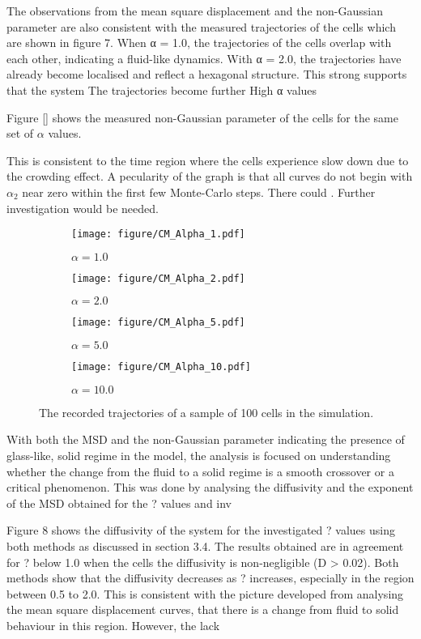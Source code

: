 \documentclass[a4paper,12pt]{article}
\begin{document}
The observations from the mean square displacement and the non-Gaussian parameter are also consistent with the measured trajectories of the cells which are shown in figure 7. When α = 1.0, the trajectories of the cells overlap with each other, indicating a fluid-like dynamics. With α = 2.0, the trajectories have already become localised and reflect a hexagonal structure. This strong supports that the system The trajectories become further  High α values 


Figure \ref{} shows the measured non-Gaussian parameter of the cells for the same set of $\alpha$ values. 

This is consistent to the time region where the cells experience slow down due to the crowding effect. A pecularity of the graph is that all curves do not begin with $\alpha_2$ near zero within the first few Monte-Carlo steps. There could . Further investigation would be needed.


\begin{figure}[h]
\centering
\begin{subfigure}[h]{0.49\textwidth}
\texttt{[image: figure/CM\_Alpha\_1.pdf]}
\caption*{$\alpha = 1.0$}
\end{subfigure}
\begin{subfigure}[h]{0.49\textwidth}
\texttt{[image: figure/CM\_Alpha\_2.pdf]}
\caption*{$\alpha = 2.0$}
\end{subfigure}
\begin{subfigure}[h]{0.49\textwidth}
\texttt{[image: figure/CM\_Alpha\_5.pdf]}
\caption*{$\alpha = 5.0$}
\end{subfigure}
\begin{subfigure}[h]{0.49\textwidth}
\texttt{[image: figure/CM\_Alpha\_10.pdf]}
\caption*{$\alpha = 10.0$}
\end{subfigure}
\caption{The recorded trajectories of a sample of 100 cells in the simulation. }
\end{figure}
\FloatBarrier
With both the MSD and the non-Gaussian parameter indicating the presence of glass-like, solid regime in the model, the analysis is focused on understanding whether the change from the fluid to a solid regime is a smooth crossover or a critical phenomenon. This was done by analysing the diffusivity and the exponent of the MSD obtained for the ? values and inv

Figure 8 shows the diffusivity of the system for the investigated ? values using both methods as discussed in section 3.4. The results obtained are in agreement for ? below 1.0 when the cells the diffusivity is non-negligible (D > 0.02). Both methods show that the diffusivity decreases as ? increases, especially in the region between 0.5 to 2.0. This is consistent with the picture developed from analysing the mean square displacement curves, that there is a change from fluid to solid behaviour in this region. However, the lack
\end{document}
